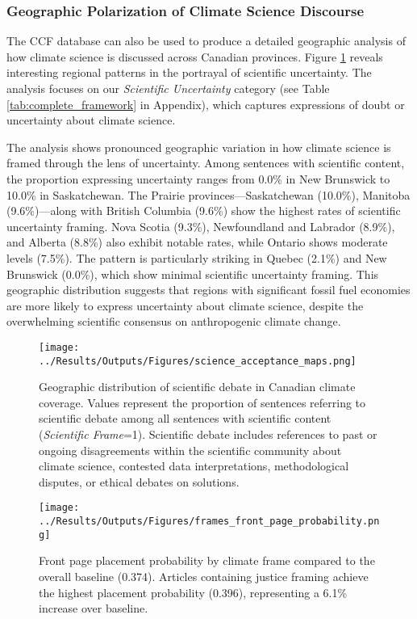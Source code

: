 \documentclass[12pt]{article}
\begin{document}
\subsubsection{Geographic Polarization of Climate Science Discourse}

The CCF database can also be used to produce a detailed geographic analysis of how climate science is discussed across Canadian provinces. Figure \ref{fig:science_acceptance} reveals interesting regional patterns in the portrayal of scientific uncertainty. The analysis focuses on our \emph{Scientific Uncertainty} category (see Table \ref{tab:complete_framework} in Appendix), which captures expressions of doubt or uncertainty about climate science.

The analysis shows pronounced geographic variation in how climate science is framed through the lens of uncertainty. Among sentences with scientific content, the proportion expressing uncertainty ranges from 0.0\% in New Brunswick to 10.0\% in Saskatchewan. The Prairie provinces—Saskatchewan (10.0\%), Manitoba (9.6\%)—along with British Columbia (9.6\%) show the highest rates of scientific uncertainty framing. Nova Scotia (9.3\%), Newfoundland and Labrador (8.9\%), and Alberta (8.8\%) also exhibit notable rates, while Ontario shows moderate levels (7.5\%). The pattern is particularly striking in Quebec (2.1\%) and New Brunswick (0.0\%), which show minimal scientific uncertainty framing. This geographic distribution suggests that regions with significant fossil fuel economies are more likely to express uncertainty about climate science, despite the overwhelming scientific consensus on anthropogenic climate change.

\begin{figure}[htbp]
\centering
\texttt{[image: ../Results/Outputs/Figures/science\_acceptance\_maps.png]}
\caption{Geographic distribution of scientific debate in Canadian climate coverage. Values represent the proportion of sentences referring to scientific debate among all sentences with scientific content (\emph{Scientific Frame}=1). Scientific debate includes references to past or ongoing disagreements within the scientific community about climate science, contested data interpretations, methodological disputes, or ethical debates on solutions.}
\label{fig:science_acceptance}
\end{figure}

\begin{figure}[htbp]
\centering
\texttt{[image: ../Results/Outputs/Figures/frames\_front\_page\_probability.png]}
\caption{Front page placement probability by climate frame compared to the overall baseline (0.374). Articles containing justice framing achieve the highest placement probability (0.396), representing a 6.1\% increase over baseline.}
\label{fig:frames_front_page}
\end{figure}
\end{document}
